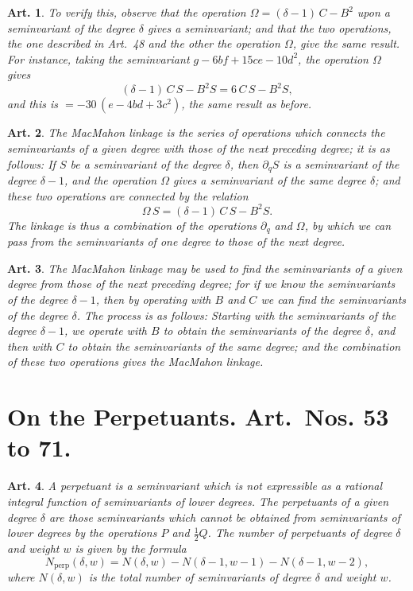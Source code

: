 \documentclass[11pt,a4paper]{article}
\theoremstyle{cayley}
\newtheorem{art}{Art.}[section]
\begin{document}
\setcounter{art}{50}
\begin{art}
To verify this, observe that the operation $\Omega = (\delta - 1)\,C - B^{2}$ upon a seminvariant of the degree $\delta$ gives a seminvariant; and that the two operations, the one described in Art.~48 and the other the operation $\Omega$, give the same result. For instance, taking the seminvariant $g - 6bf + 15ce - 10d^{2}$, the operation $\Omega$ gives
\[
(\delta - 1)\,C\,S - B^{2}S = 6\,C\,S - B^{2}S,
\]
and this is $= -30\,(e - 4bd + 3c^{2})$, the same result as before.
\end{art}

\setcounter{art}{51}
\begin{art}
The MacMahon linkage is the series of operations which connects the seminvariants of a given degree with those of the next preceding degree; it is as follows: If $S$ be a seminvariant of the degree $\delta$, then $\partial_{q}S$ is a seminvariant of the degree $\delta - 1$, and the operation $\Omega$ gives a seminvariant of the same degree $\delta$; and these two operations are connected by the relation
\[
\Omega\,S = (\delta - 1)\,C\,S - B^{2}S.
\]
The linkage is thus a combination of the operations $\partial_{q}$ and $\Omega$, by which we can pass from the seminvariants of one degree to those of the next degree.
\end{art}

\setcounter{art}{52}
\begin{art}
The MacMahon linkage may be used to find the seminvariants of a given degree from those of the next preceding degree; for if we know the seminvariants of the degree $\delta - 1$, then by operating with $B$ and $C$ we can find the seminvariants of the degree $\delta$. The process is as follows: Starting with the seminvariants of the degree $\delta - 1$, we operate with $B$ to obtain the seminvariants of the degree $\delta$, and then with $C$ to obtain the seminvariants of the same degree; and the combination of these two operations gives the MacMahon linkage.
\end{art}

\section*{On the Perpetuants. Art.~Nos. \textbf{53} to \textbf{71}.}

\setcounter{art}{52}
\begin{art}
A perpetuant is a seminvariant which is not expressible as a rational integral function of seminvariants of lower degrees. The perpetuants of a given degree $\delta$ are those seminvariants which cannot be obtained from seminvariants of lower degrees by the operations $P$ and $\frac{1}{2}Q$. The number of perpetuants of degree $\delta$ and weight $w$ is given by the formula
\[
N_{\text{perp}}(\delta, w) = N(\delta, w) - N(\delta - 1, w - 1) - N(\delta - 1, w - 2),
\]
where $N(\delta, w)$ is the total number of seminvariants of degree $\delta$ and weight $w$.
\end{art}
\end{document}
